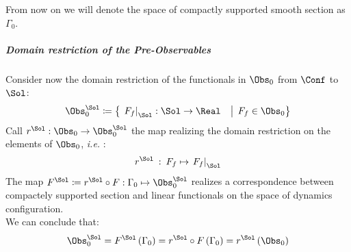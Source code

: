 \documentclass[Main]{subfiles}
\begin{document}
				From now on we will denote the space of compactly supported smooth section as $\Gamma_0$.

			\subparagraph{Domain restriction of the Pre-Observables}

				Consider now the domain restriction of the functionals in $\Obs_0$ from $\Conf$ to $\Sol$:
   					\begin{displaymath}
   						\Obs_0^\Sol \coloneqq \big\{\left.\left. F_f \right\vert_\Sol : \Sol \rightarrow \Real  \quad  \right\vert \; F_f \in \Obs_0 \big\}
   					\end{displaymath}
				Call $r^\Sol : \Obs_0 \rightarrow \Obs_0^\Sol$ the map realizing the domain restriction on the elements of $\Obs_0$,
				 \textit{i.e.} :$$r^\Sol \: : \: F_f  \mapsto \left. F_f \right\vert_\Sol $$
				The map $F^\Sol \coloneqq r^\Sol \circ F : \Gamma_0 \mapsto \Obs_0^\Sol $ realizes a correspondence between compactely supported section and linear functionals on the space of dynamics configuration.\\
				We can conclude that:
				\begin{displaymath}
					\Obs_0^\Sol = F^\Sol \left( \Gamma_0\right) = r^\Sol \circ F \left(\Gamma_0 \right) = r^\Sol \left( \Obs_0 \right)
				\end{displaymath}
\end{document}
